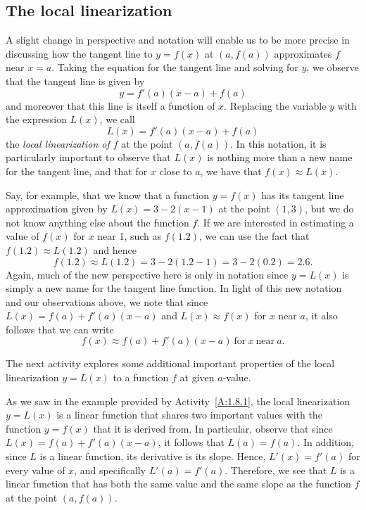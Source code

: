 \subsection*{The local linearization} 

A slight change in perspective and notation will enable us to be more precise in discussing how the tangent line to $y = f(x)$ at $(a,f(a))$ approximates $f$ near $x = a$.  Taking the equation for the tangent line and solving for $y$, we observe that the tangent line is given by
$$y = f'(a)(x-a) + f(a)$$
and moreover that this line is itself a function of $x$.  Replacing the variable $y$ with the expression $L(x)$, we call
$$L(x) = f'(a)(x-a) + f(a)$$
the \emph{local linearization of $f$} at the point $(a,f(a))$.  In this notation, it is particularly important to observe that $L(x)$ is nothing more than a new name for the tangent line, and that for $x$ close to $a$, we have that $f(x) \approx L(x)$.

Say, for example, that we know that a function $y = f(x)$ has its tangent line approximation given by $L(x) = 3 - 2(x-1)$ at the point $(1,3)$, but we do not know anything else about the function $f$.  If we are interested in estimating a value of $f(x)$ for $x$ near 1, such as $f(1.2)$, we can use the fact that $f(1.2) \approx L(1.2)$ and hence
$$f(1.2) \approx L(1.2) = 3 - 2(1.2-1) = 3 - 2(0.2) = 2.6.$$
Again, much of the new perspective here is only in notation since $y = L(x)$ is simply a new name for the tangent line function.  In light of this new notation and our observations above, we note that since $L(x) = f(a) + f'(a)(x-a)$ and $L(x) \approx f(x)$ for $x$ near $a$, it also follows that we can write
$$f(x) \approx f(a) + f'(a)(x-a) \ \mbox{for} \  x \ \mbox{near} \ a.$$

The next activity explores some additional important properties of the local linearization $y = L(x)$ to a function $f$ at given $a$-value.



As we saw in the example provided by Activity~\ref{A:1.8.1}, the local linearization $y = L(x)$ is a linear function that shares two important values with the function $y = f(x)$ that it is derived from.  In particular, observe that since $L(x) = f(a) + f'(a)(x-a)$, it follows that $L(a) = f(a)$.  In addition, since $L$ is a linear function, its derivative is its slope.  Hence, $L'(x) = f'(a)$ for every value of $x$, and specifically $L'(a) = f'(a)$.  Therefore, we see that $L$ is a linear function that has both the same value and the same slope as the function $f$ at the point $(a,f(a))$.

